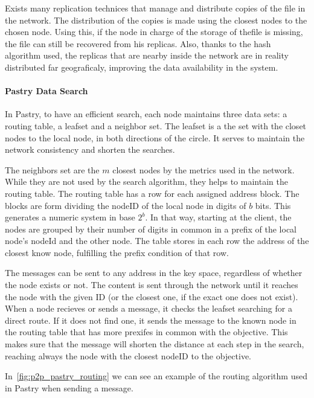 Exists many replication technices that manage and distribute copies of the file
in the network. The distribution of the copies is made using the closest nodes
to the chosen node. Using this, if the node in charge of the storage of thefile
is missing, the file can still be recovered from his replicas. Also, thanks
to the hash algorithm used, the replicas that are nearby inside the network are
in reality distributed far geograficaly, improving the data availability
in the system.

\paragraph{Pastry Data Search}

In Pastry, to have an efficient search, each node maintains three data sets:
a routing table, a leafset and a neighbor set.
The leafset is a the set with the closet nodes to the local node, in both
directions of the circle. It serves to maintain the network consistency and
shorten the searches.

The neighbors set are the $m$ closest nodes by the metrics used in the network.
While they are not used by the search algorithm, they helps to maintain the
routing table.
The routing table has a row for each assigned address block. The blocks are
form dividing the nodeID of the local node in digits of $b$ bits. This
generates a numeric system in base $2^b$. In that way, starting at the client,
the nodes are grouped by their number of digits in common in a prefix of the
local node's nodeId and the other node. The table stores in each row the
address of the closest know node, fulfilling the prefix condition of that row.

The messages can be sent to any address in the key space, regardless of whether
the node exists or not. The content is sent through the network until it reaches the node with the given ID (or the closest one, if the exact one does not exist). When a node recieves or sends a message, it checks the leafset searching for a direct route. If it does not find one, it sends the message to the known node in the routing table that has  more prexifes in common with the objective. This makes sure that the message will shorten the distance at each step in the search, reaching always the node with the closest nodeID to the objective.

In~\ref{fig:p2p_pastry_routing} we can see an example of the routing algorithm used in Pastry when sending a message.

